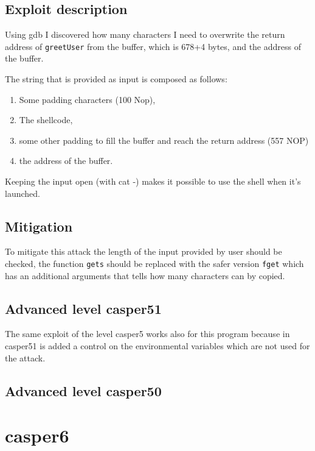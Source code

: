 \documentclass[a4paper,12pt]{article}
\begin{document}
\subsection{Exploit description}
Using gdb I discovered how many characters I need to overwrite the return address of \texttt{greetUser} from the buffer, which is 678+4 bytes, and the address of the buffer.

The string that is provided as input is composed as follows:
\begin{enumerate}
\item Some padding characters (100 Nop),
\item The shellcode,
\item some other padding to fill the buffer and reach the return address (557 NOP)
\item the address of the buffer.
\end{enumerate}

Keeping the input open (with cat -) makes it possible to use the shell when it's launched.


\subsection{Mitigation}

To mitigate this attack the length of the input provided by user should be checked, the function \texttt{gets} should be replaced with the safer version \texttt{fget} which has an additional arguments that tells how many characters can by copied.

\subsection{Advanced level casper51}
The same exploit of the level casper5 works also for this program because in casper51 is added a control on the environmental variables which are not used for the attack. 


\subsection{Advanced level casper50}

\section{casper6}
\end{document}

